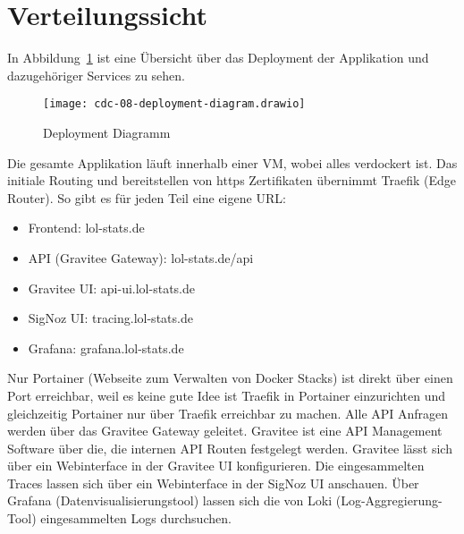 \section{Verteilungssicht}

In Abbildung~\ref{fig:deployment-diagram} ist eine Übersicht über das Deployment der Applikation und dazugehöriger
Services zu sehen.
\begin{figure}
    \centering
    \texttt{[image: cdc-08-deployment-diagram.drawio]}
    \caption{Deployment Diagramm}
    \label{fig:deployment-diagram}
\end{figure}

Die gesamte Applikation läuft innerhalb einer VM, wobei alles verdockert ist.
Das initiale Routing und bereitstellen von https Zertifikaten übernimmt Traefik (Edge Router).
So gibt es für jeden Teil eine eigene URL:
\begin{itemize}
    \item Frontend: lol-stats.de
    \item API (Gravitee Gateway): lol-stats.de/api
    \item Gravitee UI: api-ui.lol-stats.de
    \item SigNoz UI: tracing.lol-stats.de
    \item Grafana: grafana.lol-stats.de
\end{itemize}

Nur Portainer (Webseite zum Verwalten von Docker Stacks) ist direkt über einen Port erreichbar, weil es keine gute Idee ist Traefik in Portainer einzurichten
und gleichzeitig Portainer nur über Traefik erreichbar zu machen.
Alle API Anfragen werden über das Gravitee Gateway geleitet.
Gravitee ist eine API Management Software über die, die internen API Routen festgelegt werden.
Gravitee lässt sich über ein Webinterface in der Gravitee UI konfigurieren.
Die eingesammelten Traces lassen sich über ein Webinterface in der SigNoz UI anschauen.
Über Grafana (Datenvisualisierungstool) lassen sich die von Loki (Log-Aggregierung-Tool) eingesammelten Logs durchsuchen.
